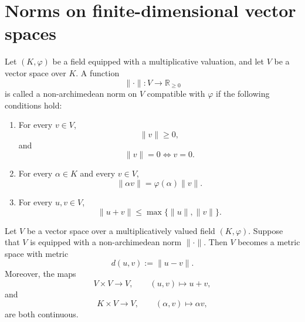 \section{Norms on finite-dimensional vector spaces}

\begin{definition}
    Let \((K,\varphi)\) be a field equipped with a multiplicative valuation, and let
    \(V\) be a vector space over \(K\). A function
    \[
        \|\cdot\|:V\longrightarrow \mathbb{R}_{\geq 0}
    \]
    is called a non-archimedean norm on \(V\) compatible with \(\varphi\) if the
    following conditions hold:
    \begin{enumerate}
        \item For every \(v\in V\),
              \[
                  \|v\|\geq 0,
              \]
              and
              \[
                  \|v\|=0 \Longleftrightarrow v=0.
              \]

        \item For every \(\alpha\in K\) and every \(v\in V\),
              \[
                  \|\alpha v\|=\varphi(\alpha)\|v\|.
              \]

        \item For every \(u,v\in V\),
              \[
                  \|u+v\|\leq \max\{\|u\|,\|v\|\}.
              \]
    \end{enumerate}
\end{definition}

\begin{proposition}
    Let \(V\) be a vector space over a multiplicatively valued field \((K,\varphi)\).
    Suppose that \(V\) is equipped with a non-archimedean norm \(\|\cdot\|\).
    Then \(V\) becomes a metric space with metric
    \[
        d(u,v):=\|u-v\|.
    \]
    Moreover, the maps
    \[
        V\times V\longrightarrow V,
        \qquad
        (u,v)\longmapsto u+v,
    \]
    and
    \[
        K\times V\longrightarrow V,
        \qquad
        (\alpha,v)\longmapsto \alpha v,
    \]
    are both continuous.
\end{proposition}

